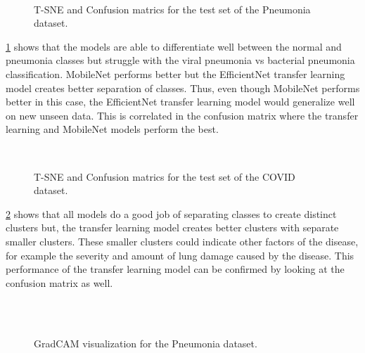 \documentclass[10pt,twocolumn,letterpaper]{article}
\begin{document}
\begin{figure}
  \\
  \caption{T-SNE and Confusion matrics for the test set of the Pneumonia dataset.}
  \label{fig:tsne_pneumonia}
\end{figure}


\cref{fig:tsne_pneumonia} shows that the models are able to differentiate well between the normal and pneumonia 
classes but struggle with the viral pneumonia vs bacterial pneumonia classification. MobileNet performs better 
but the EfficientNet transfer learning model creates better separation of classes. Thus, even though 
MobileNet performs better in this case, 
the EfficientNet transfer learning model would generalize well on new unseen data. This is correlated in 
the confusion matrix where the transfer learning and MobileNet models perform the best.

\begin{figure}
  \\
  \caption{T-SNE and Confusion matrics for the test set of the COVID dataset.}
  \label{fig:tsne_covid}
\end{figure}

\cref{fig:tsne_covid} shows that all models do a good job of separating classes to create distinct clusters 
but, the transfer learning model creates better clusters with separate smaller clusters. These smaller 
clusters could indicate other factors of the disease, for example the severity and amount of lung damage caused 
by the disease. This performance of the transfer learning model can be confirmed by looking at the confusion 
matrix as well.



\begin{figure}
  \\
  \\
  \caption{GradCAM visualization for the Pneumonia dataset.}
  \label{fig:gradcam_pneumonia}
\end{figure}
\end{document}
